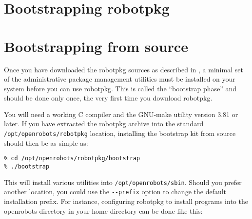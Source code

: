 %
%
%
%
%

\section{Bootstrapping robotpkg} %

\section{Bootstrapping from source} %

Once    you    have downloaded  the     robotpkg    sources  as  described   in
, a   minimal  set of   the
administrative  package management utilities must   be installed on your system
before you can use robotpkg.  This is called the ``bootstrap phase'' and should
be done only once, the very first time you download robotpkg.

You will  need a working C compiler  and the GNU-make   utility version 3.81 or
later.    If you have  extracted  the  robotpkg  archive  into  the standard {\tt
/opt/openrobots/robotpkg} location, installing the   bootstrap kit from  source
should then be as simple as:

\begin{verbatim}
% cd /opt/openrobots/robotpkg/bootstrap
% ./bootstrap
\end{verbatim}

This will  install various utilities   into {\tt /opt/openrobots/sbin}.  Should
you prefer another   location, you could  use the  {\tt -{}-prefix}  option  to
change the default installation  prefix.  For instance, configuring robotpkg to
install programs  into the openrobots directory  in your home directory  can be
done like this:

